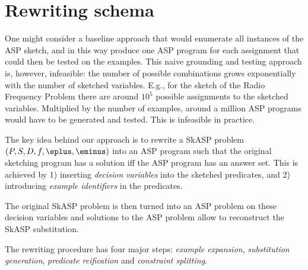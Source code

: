 \section{Rewriting schema}\label{sec:method}
One might consider a baseline approach that would enumerate all instances of the ASP sketch, and in this way produce
one ASP program for each assignment that could then be tested on the examples. 
This naive grounding and testing approach is, however, infeasible: the number of possible combinations grows exponentially with the number of sketched variables. E.g., for the sketch of the Radio Frequency Problem \parencite{fap} there are around $10^5$ possible assignments to the sketched variables. Multiplied by the number of examples, around a million ASP programs would have to be generated and tested. This is  infeasible in practice.   



The key idea behind our approach is to rewrite a SkASP problem $(P,S,D,f,\eplus,\eminus)$ into an ASP program such that the original sketching program has a solution iff the ASP program has an answer set. 
This is achieved by 1) inserting \textit{decision variables} into the sketched predicates,
and 2) introducing {\em example identifiers} in the predicates. 

The original SkASP problem is then turned into an ASP problem  
on these decision variables and solutions to the ASP problem allow to reconstruct the SkASP substitution.


The rewriting procedure has four major steps: \textit{example expansion}, \textit{substitution generation}, \textit{predicate reification} and \textit{constraint splitting}.  

